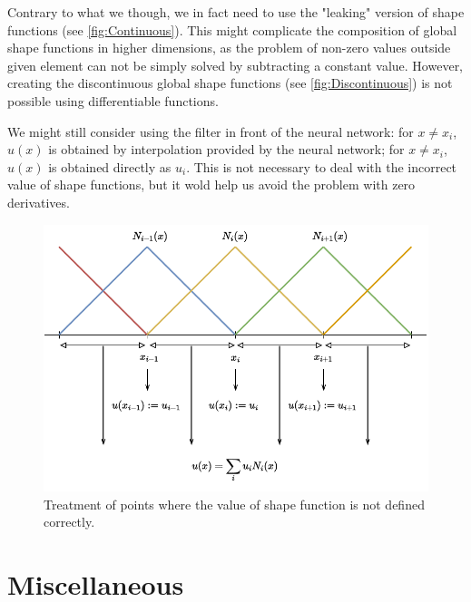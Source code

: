 Contrary to what we though, we in fact need to use the "leaking" version of shape functions (see \cref{fig:Continuous}). This might complicate the composition of global shape functions in higher dimensions, as the problem of non-zero values outside given element can not be simply solved by subtracting a constant value. However, creating the discontinuous global shape functions (see \cref{fig:Discontinuous}) is not possible using differentiable functions.

 We might still consider using the filter in front of the neural network: for $x \neq x_i$, $u(x)$ is obtained by interpolation provided by the neural network; for $x \neq x_i$, $u(x)$ is obtained directly as $u_i$. This is not necessary to deal with the incorrect value of shape functions, but it wold help us avoid the problem with zero derivatives.

 
\begin{figure}
    \centering
    \includegraphics[trim={0 0 0 0},clip,width = 0.6\linewidth]{Figures/ShapeFunctions_1.drawio.pdf}    
    \caption{Treatment of points where the value of shape function is not defined correctly. }
    \label{fig:ShFDiscont}
\end{figure}


\section{Miscellaneous}


 
